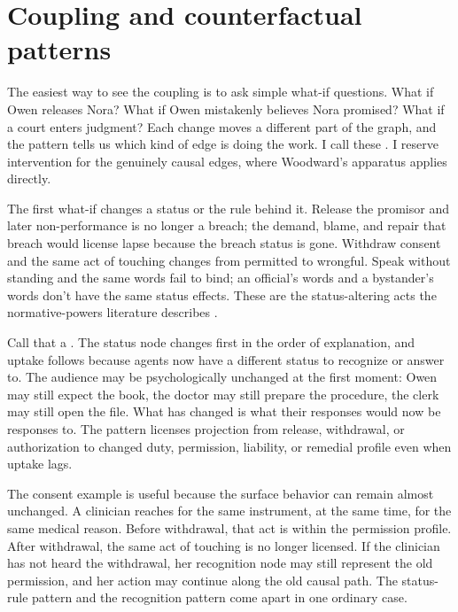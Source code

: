 \documentclass[12pt]{article}
\begin{document}
\section{Coupling and counterfactual patterns}
\label{sec:coupling}

The easiest way to see the coupling is to ask simple what-if questions. What if Owen releases Nora? What if Owen mistakenly believes Nora promised? What if a court enters judgment? Each change moves a different part of the graph, and the pattern tells us which kind of edge is doing the work. I call these . I reserve intervention for the genuinely causal edges, where Woodward's apparatus applies directly.

The first what-if changes a status or the rule behind it. Release the promisor and later non-performance is no longer a breach; the demand, blame, and repair that breach would license lapse because the breach status is gone. Withdraw consent and the same act of touching changes from permitted to wrongful. Speak without standing and the same words fail to bind; an official's words and a bystander's words don't have the same status effects. These are the status-altering acts the normative-powers literature describes \citep{owens2012ShapingNormativeLandscape,raz2022NormativePowers}.

Call that a . The status node changes first in the order of explanation, and uptake follows because agents now have a different status to recognize or answer to. The audience may be psychologically unchanged at the first moment: Owen may still expect the book, the doctor may still prepare the procedure, the clerk may still open the file. What has changed is what their responses would now be responses to. The pattern licenses projection from release, withdrawal, or authorization to changed duty, permission, liability, or remedial profile even when uptake lags.

The consent example is useful because the surface behavior can remain almost unchanged. A clinician reaches for the same instrument, at the same time, for the same medical reason. Before withdrawal, that act is within the permission profile. After withdrawal, the same act of touching is no longer licensed. If the clinician has not heard the withdrawal, her recognition node may still represent the old permission, and her action may continue along the old causal path. The status-rule pattern and the recognition pattern come apart in one ordinary case.
\end{document}
